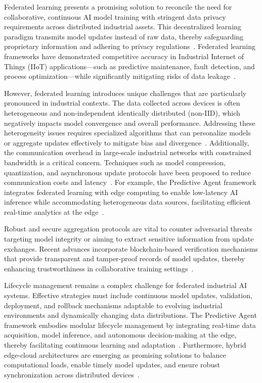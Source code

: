 \documentclass[sigconf]{acmart}
\begin{document}
Federated learning presents a promising solution to reconcile the need for collaborative, continuous AI model training with stringent data privacy requirements across distributed industrial assets. This decentralized learning paradigm transmits model updates instead of raw data, thereby safeguarding proprietary information and adhering to privacy regulations~\cite{ref32}. Federated learning frameworks have demonstrated competitive accuracy in Industrial Internet of Things (IIoT) applications—such as predictive maintenance, fault detection, and process optimization—while significantly mitigating risks of data leakage~\cite{ref34}.

However, federated learning introduces unique challenges that are particularly pronounced in industrial contexts. The data collected across devices is often heterogeneous and non-independent identically distributed (non-IID), which negatively impacts model convergence and overall performance. Addressing these heterogeneity issues requires specialized algorithms that can personalize models or aggregate updates effectively to mitigate bias and divergence~\cite{ref36}. Additionally, the communication overhead in large-scale industrial networks with constrained bandwidth is a critical concern. Techniques such as model compression, quantization, and asynchronous update protocols have been proposed to reduce communication costs and latency~\cite{ref36}. For example, the Predictive Agent framework integrates federated learning with edge computing to enable low-latency AI inference while accommodating heterogeneous data sources, facilitating efficient real-time analytics at the edge~\cite{ref37}.

Robust and secure aggregation protocols are vital to counter adversarial threats targeting model integrity or aiming to extract sensitive information from update exchanges. Recent advances incorporate blockchain-based verification mechanisms that provide transparent and tamper-proof records of model updates, thereby enhancing trustworthiness in collaborative training settings~\cite{ref38}.

Lifecycle management remains a complex challenge for federated industrial AI systems. Effective strategies must include continuous model updates, validation, deployment, and rollback mechanisms adaptable to evolving industrial environments and dynamically changing data distributions. The Predictive Agent framework embodies modular lifecycle management by integrating real-time data acquisition, model inference, and autonomous decision-making at the edge, thereby facilitating continuous learning and adaptation~\cite{ref37}. Furthermore, hybrid edge-cloud architectures are emerging as promising solutions to balance computational loads, enable timely model updates, and ensure robust synchronization across distributed devices~\cite{ref36}.
\end{document}
